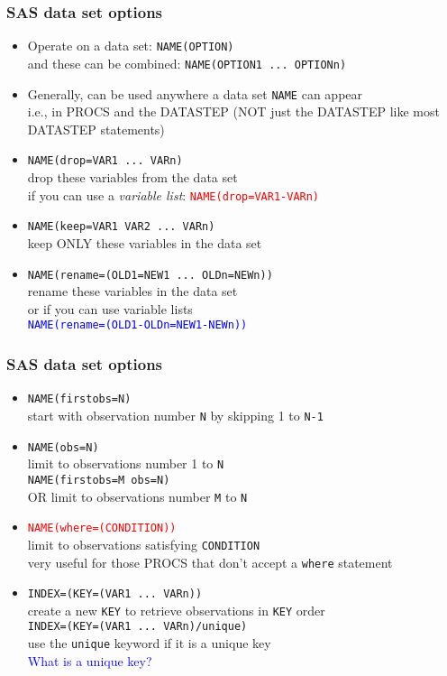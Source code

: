 \documentclass[11pt,pdftex,dvipsnames,usenames,helvetica]{beamer}
\begin{document}
\begin{frame}[fragile]
\frametitle{SAS data set options}
\begin{itemize}
\item Operate on a data set: {\tt NAME(OPTION)}\\
and these can be combined:  {\tt NAME(OPTION1 ...\ OPTIONn)}\\
\item Generally, can be used anywhere a data set {\tt NAME} can appear\\
i.e., in PROCS and the DATASTEP (NOT just the DATASTEP like 
most DATASTEP statements)
\item {\tt NAME(drop=VAR1 ...\ VARn)}\\ 
drop these variables from the data set\\
if you can use a {\it variable list}: 
\textcolor{red}{\tt NAME(drop=VAR1-VARn)}
\item {\tt NAME(keep=VAR1 VAR2 ...\ VARn)}\\ 
keep ONLY these variables in the data set\\
\item {\tt NAME(rename=(OLD1=NEW1 ...\ OLDn=NEWn))}\\
rename these variables in the data set\\
or if you can use variable lists\\
\textcolor{blue}{\tt NAME(rename=(OLD1-OLDn=NEW1-NEWn))}
\end{itemize}
\end{frame}

\begin{frame}[fragile]
\frametitle{SAS data set options}
\begin{itemize}
\item {\tt NAME(firstobs=N)}\\
start with observation number {\tt N} by skipping 1 to {\tt N-1}
\item {\tt NAME(obs=N)}\\
limit to observations number 1 to {\tt N}\\
{\tt NAME(firstobs=M obs=N)}\\
OR limit to observations number {\tt M} to {\tt N}\\
\item \textcolor{red}{\tt NAME(where=(CONDITION))}\\
limit to observations satisfying {\tt CONDITION}\\
very useful for those PROCS that don't accept a {\tt where} statement
\item {\tt INDEX=(KEY=(VAR1 ...\ VARn))}\\
create a new {\tt KEY} to retrieve observations in {\tt KEY} order\\ 
{\tt INDEX=(KEY=(VAR1 ...\ VARn)/unique)}\\
use the {\tt unique} keyword if it is a unique key\\
\textcolor{blue}{What is a unique key?}
\end{itemize}
\end{frame}
\end{document}
